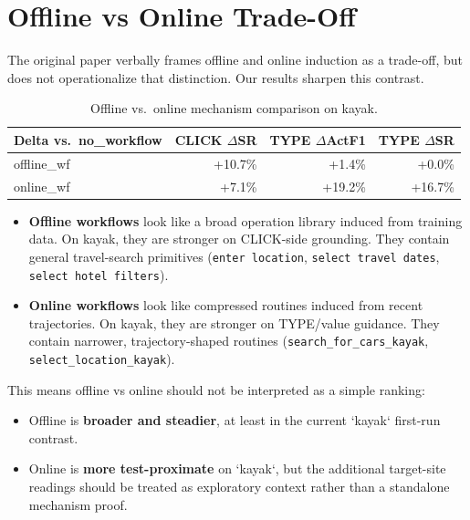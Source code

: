 \documentclass{article}
\providecommand{\tightlist}{%
  \setlength{\itemsep}{0pt}\setlength{\parskip}{0.8em}}
\begin{document}
\section{Offline vs Online
Trade-Off}\label{offline-vs-online-trade-off}

The original paper verbally frames offline and online induction as a
trade-off, but does not operationalize that distinction. Our results
sharpen this contrast.

{\begin{longtable}[]{@{}lrrr@{}}
\caption{Offline vs.~online mechanism comparison on kayak.}\label{tab:offline-vs-online-mechanism-comparison-on-kay}\\

\toprule\noalign{}
Delta vs.~no\_workflow & CLICK \ensuremath{\Delta}SR & TYPE \ensuremath{\Delta}ActF1 & TYPE \ensuremath{\Delta}SR \\
\midrule\noalign{}
\endhead
\bottomrule\noalign{}
\endlastfoot
offline\_wf & +10.7\% & +1.4\% & +0.0\% \\
online\_wf & +7.1\% & +19.2\% & +16.7\% \\
\end{longtable}
}

\begin{itemize}
\tightlist
\item
  \textbf{Offline workflows} look like a broad operation library induced
  from training data. On kayak, they are stronger on CLICK-side
  grounding. They contain general travel-search primitives
  (\texttt{enter\ location}, \texttt{select\ travel\ dates},
  \texttt{select\ hotel\ filters}).
\item
  \textbf{Online workflows} look like compressed routines induced from
  recent trajectories. On kayak, they are stronger on
  TYPE/value guidance. They contain narrower, trajectory-shaped routines
  (\texttt{search\_for\_cars\_kayak}, \texttt{select\_location\_kayak}).
\end{itemize}

This means offline vs online should not be interpreted as a simple
ranking:

\begin{itemize}
\tightlist
\item
  Offline is \textbf{broader and steadier}, at least in the current
  `kayak` first-run contrast.
\item
  Online is \textbf{more test-proximate} on `kayak`, but the additional
  target-site readings should be treated as exploratory context rather
  than a standalone mechanism proof.
\end{itemize}
\end{document}
